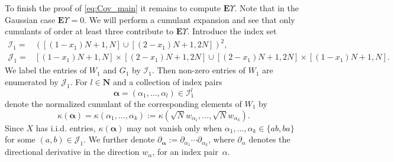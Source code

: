 \documentclass[10pt]{amsart}
\numberwithin{equation}{section}
\newcommand{\E}{\mathbf{E}}
\newcommand{\N}{\mathbf{N}}
\begin{document}
To finish the proof of \eqref{eq:Cov_main} it remains to compute $\E \Upsilon$. Note that in the Gaussian case $\E\Upsilon=0$. We will perform a cumulant expansion and see that only cumulants of order at least three contribute to $\E\Upsilon$. Introduce the index set 
\begin{equation}
\begin{split}
\mathcal{I}_1=& \left([(1-x_1)N+1,N] \cup [(2-x_1)N+1,2N]\right)^2,\\
\mathcal{J}_1=& [(1-x_1)N+1,N] \times [(2-x_1)N+1,2N] \cup [(2-x_1)N+1,2N]\times [(1-x_1)N+1,N].
\end{split}
\label{eq:def_IJ}
\end{equation}
We label the entries of $W_1$ and $G_1$ by $\mathcal{I}_1$. Then non-zero entries of $W_1$ are enumerated by $\mathcal{J}_1$. For $l\in \N$ and a collection of index pairs
\begin{equation}
\bm{\alpha}=\left(\alpha_1,\ldots,\alpha_l\right)\in \mathcal{I}_1^l
\label{eq:def_index_set}
\end{equation}
denote the normalized cumulant of the corresponding elements of $W_1$ by
\begin{equation}
\kappa(\bm{\alpha})=\kappa(\alpha_1,\ldots,\alpha_k):=\kappa(\sqrt{N}w_{\alpha_1},\ldots,\sqrt{N}w_{\alpha_k}).
\label{eq:def_cum}
\end{equation}
Since $X$ has i.i.d. entries, $\kappa(\bm{\alpha})$ may not vanish only when $\alpha_1,\ldots,\alpha_k\in\{ab,ba\}$ for some $(a,b)\in\mathcal{J}_1$. We further denote $\partial_{\bm{\alpha}}:=\partial_{\alpha_1}\cdots\partial_{\alpha_k}$, where $\partial_{\alpha}$ denotes the directional derivative in the direction $w_{\alpha}$, for an index pair~$\alpha$.
\end{document}
